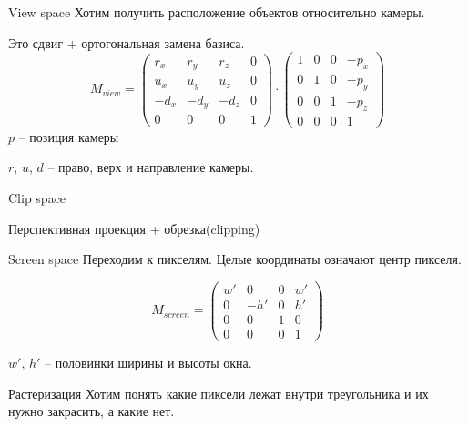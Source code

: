 \documentclass{beamer}
\begin{document}
\begin{frame}{View space}
    Хотим получить расположение объектов относительно камеры.

    Это сдвиг + ортогональная замена базиса.
    \[
        M_{view} = \begin{pmatrix}
            r_x & r_y & r_z & 0\\
            u_x & u_y & u_z & 0\\
            -d_x & -d_y & -d_z & 0\\
            0 & 0 & 0 & 1
        \end{pmatrix}\cdot
        \begin{pmatrix}
            1 & 0 & 0 & -p_x\\
            0 & 1 & 0 & -p_y\\
            0 & 0 & 1 & -p_z\\
            0 & 0 & 0 & 1
        \end{pmatrix}
    \]
    $p$ -- позиция камеры

    $r$, $u$, $d$ -- право, верх и направление камеры.

\end{frame}

\begin{frame}{Clip space}

Перспективная проекция + обрезка(clipping)

\end{frame}

\begin{frame}{Screen space}
    Переходим к пикселям. Целые координаты означают центр 
    пикселя. 
    
    \[
        M_{screen} = 
        \begin{pmatrix}
            w' & 0 & 0 & w'\\
            0 & -h' & 0 & h'\\
            0 & 0 & 1 & 0\\
            0 & 0 & 0 & 1
        \end{pmatrix}
    \]

    $w'$, $h'$ -- половинки ширины и высоты окна.

\end{frame}

\begin{frame}{Растеризация}
    Хотим понять какие пиксели лежат внутри треугольника и их нужно 
    закрасить, а какие нет.
\end{frame}
\end{document}
